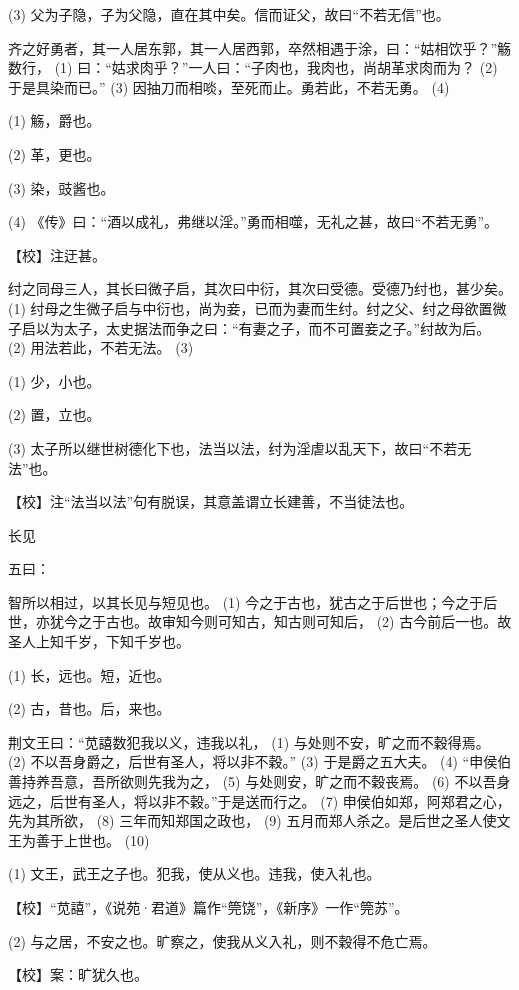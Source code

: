 \documentclass[12pt,UTF8]{ctexbook}
\begin{document}
(3) 父为子隐，子为父隐，直在其中矣。信而证父，故曰“不若无信”也。

齐之好勇者，其一人居东郭，其一人居西郭，卒然相遇于涂，曰：“姑相饮乎？”觞数行， (1) 曰：“姑求肉乎？”一人曰：“子肉也，我肉也，尚胡革求肉而为？ (2) 于是具染而已。” (3) 因抽刀而相啖，至死而止。勇若此，不若无勇。 (4)

(1) 觞，爵也。

(2) 革，更也。

(3) 染，豉酱也。

(4) 《传》曰：“酒以成礼，弗继以淫。”勇而相噬，无礼之甚，故曰“不若无勇”。

【校】注迂甚。

纣之同母三人，其长曰微子启，其次曰中衍，其次曰受德。受德乃纣也，甚少矣。 (1) 纣母之生微子启与中衍也，尚为妾，已而为妻而生纣。纣之父、纣之母欲置微子启以为太子，太史据法而争之曰：“有妻之子，而不可置妾之子。”纣故为后。 (2) 用法若此，不若无法。 (3)

(1) 少，小也。

(2) 置，立也。

(3) 太子所以继世树德化下也，法当以法，纣为淫虐以乱天下，故曰“不若无法”也。

【校】注“法当以法”句有脱误，其意盖谓立长建善，不当徒法也。





长见


五曰：

智所以相过，以其长见与短见也。 (1) 今之于古也，犹古之于后世也；今之于后世，亦犹今之于古也。故审知今则可知古，知古则可知后， (2) 古今前后一也。故圣人上知千岁，下知千岁也。

(1) 长，远也。短，近也。

(2) 古，昔也。后，来也。

荆文王曰：“苋譆数犯我以义，违我以礼， (1) 与处则不安，旷之而不穀得焉。 (2) 不以吾身爵之，后世有圣人，将以非不穀。” (3) 于是爵之五大夫。 (4) “申侯伯善持养吾意，吾所欲则先我为之， (5) 与处则安，旷之而不穀丧焉。 (6) 不以吾身远之，后世有圣人，将以非不穀。”于是送而行之。 (7) 申侯伯如郑，阿郑君之心，先为其所欲， (8) 三年而知郑国之政也， (9) 五月而郑人杀之。是后世之圣人使文王为善于上世也。 (10)

(1) 文王，武王之子也。犯我，使从义也。违我，使入礼也。

【校】“苋譆”，《说苑·君道》篇作“筦饶”，《新序》一作“筦苏”。

(2) 与之居，不安之也。旷察之，使我从义入礼，则不穀得不危亡焉。

【校】案：旷犹久也。
\end{document}
